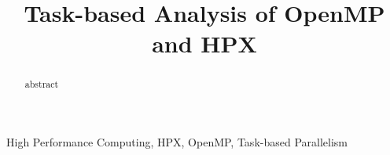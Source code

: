 \documentclass[conference]{IEEEtran}
\begin{document}
\title{Task-based Analysis of OpenMP and HPX}

\author{
}

\maketitle

\begin{abstract}
abstract
\end{abstract}

\begin{IEEEkeywords}
High Performance Computing, HPX, OpenMP, Task-based Parallelism
\end{IEEEkeywords}


















{}
\end{document}
